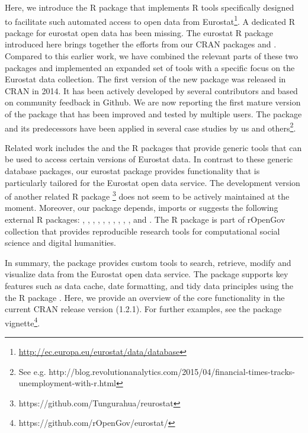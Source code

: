 Here, we introduce the  R package that implements R
tools specifically designed to facilitate such automated access to
open data from
Eurostat\footnote{\url{http://ec.europa.eu/eurostat/data/database}}. A
dedicated R package for eurostat open data has been missing. The
eurostat R package introduced here brings together the efforts from
our CRAN packages  \citep{statfi}
and 
\citep{smarterpoland}. Compared to this earlier work, we have combined the
relevant parts of these two packages and implemented an expanded set
of tools with a specific focus on the Eurostat data collection. The
first version of the new  package was released in
CRAN in 2014. It has been actively developed by several contributors
and based on community feedback in Github. We are now reporting the
first mature version of the package that has been improved and tested
by multiple users. The package and its predecessors have been applied
in several case studies by us and others\footnote{See
e.g. http://blog.revolutionanalytics.com/2015/04/financial-times-tracks-unemployment-with-r.html}.

Related work includes the  \citep{datamart} and the
\citep{quandl} R packages that provide generic tools that can be used to access
certain versions of Eurostat data. In contrast to these generic
database packages, our eurostat package provides functionality that is
particularly tailored for the Eurostat open data service. The
development version of another related R package
\footnote{https://github.com/Tungurahua/reurostat} does not seem to be actively maintained at the moment.
Moreover, our  package depends, imports or suggests
the following external R packages:
 \citep{devtools},  \citep{dplyr},
 \citep{knitr},  \citep{ggplot2},
 \citep{mapproj},  \citep{plotrix},
 \citep{reshape2}, 
\citep{rmarkdown},  \citep{stringi},
 \citep{testthat}, and 
\citep{tidyr}. The  R package is
part of rOpenGov collection
\citep{Lahti13icml} that provides reproducible research tools for
computational social science and digital humanities.

In summary, the  package provides custom tools to
search, retrieve, modify and visualize data from the Eurostat open
data service. The package supports key features such as data cache,
date formatting, and tidy data principles \citep{wickham2014} using
the the  R package \citep{tidyr}. Here, we provide an
overview of the core functionality in the current CRAN release version
(1.2.1). For further examples, see the package
vignette\footnote{https://github.com/rOpenGov/eurostat/}.


